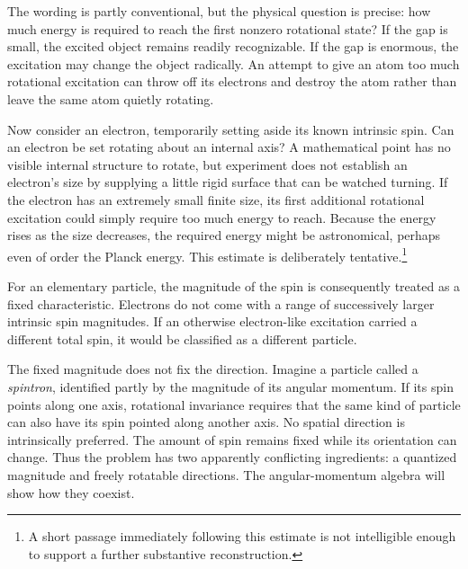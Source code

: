 The wording is partly conventional, but the physical question is precise: how much energy is required to reach the first nonzero rotational state? If the gap is small, the excited object remains readily recognizable. If the gap is enormous, the excitation may change the object radically. An attempt to give an atom too much rotational excitation can throw off its electrons and destroy the atom rather than leave the same atom quietly rotating.

Now consider an electron, temporarily setting aside its known intrinsic spin. Can an electron be set rotating about an internal axis? A mathematical point has no visible internal structure to rotate, but experiment does not establish an electron's size by supplying a little rigid surface that can be watched turning. If the electron has an extremely small finite size, its first additional rotational excitation could simply require too much energy to reach. Because the energy rises as the size decreases, the required energy might be astronomical, perhaps even of order the Planck energy. This estimate is deliberately tentative.\footnote{A short passage immediately following this estimate is not intelligible enough to support a further substantive reconstruction.}

For an elementary particle, the magnitude of the spin is consequently treated as a fixed characteristic. Electrons do not come with a range of successively larger intrinsic spin magnitudes. If an otherwise electron-like excitation carried a different total spin, it would be classified as a different particle.

The fixed magnitude does not fix the direction. Imagine a particle called a \emph{spintron}, identified partly by the magnitude of its angular momentum. If its spin points along one axis, rotational invariance requires that the same kind of particle can also have its spin pointed along another axis. No spatial direction is intrinsically preferred. The amount of spin remains fixed while its orientation can change. Thus the problem has two apparently conflicting ingredients: a quantized magnitude and freely rotatable directions. The angular-momentum algebra will show how they coexist.

